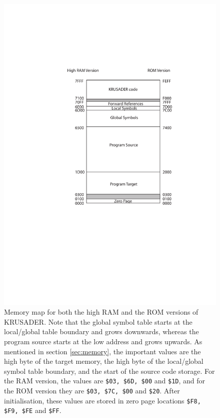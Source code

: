 \documentclass[12pt]{article}
\newcommand{\krusader}{\textsf{KRUSADER}\xspace}
\begin{document}
\begin{figure}[tb]
\centering
\includegraphics[scale=0.85]{Memory.pdf}
\caption{Memory map for both the high RAM and the ROM versions of \krusader.
Note that the global symbol table starts at the local/global table boundary and grows downwards, whereas the 
program source starts at the low address and grows upwards.
As mentioned in section \protect\ref{sec:memory}, the important values are the high byte of the target
memory, the high byte of the local/global symbol table boundary, and the start of the source code storage.  For the RAM version, the values are \texttt{\$03, \$6D, \$00} and \texttt{\$1D}, and for the ROM version
they are \texttt{\$03, \$7C, \$00} and \texttt{\$20}.
After initialisation, these values are stored in zero page locations \texttt{\$F8, \$F9, \$FE} and \texttt{\$FF}.
}
\label{fig:memmap}
\end{figure}
\end{document}
